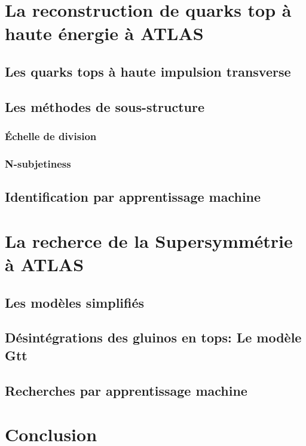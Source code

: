 \documentclass[12pt,canadien]{article}
\begin{document}
\singlespacing{}
\section{La reconstruction de quarks top à haute énergie à ATLAS}
\label{sec:top}
\doublespacing{}

\subsection{Les quarks tops à haute impulsion transverse}
\label{sec:top:boosted}

\subsection{Les méthodes de sous-structure}
\label{sec:top:sous_structure}

\subsubsection{Échelle de division}
\label{sec:top:sous_structure:d_ij}

\subsubsection{N-subjetiness}
\label{sec:top:sous_structure:tau_ij}



\subsection{Identification par apprentissage machine}
\label{sec:top:ml}

\singlespacing{}
\section{La recherce de la Supersymmétrie à ATLAS}
\label{susy_atlas}
\doublespacing{}

\subsection{Les modèles simplifiés}
\label{sec:susy_atlas:modele_simple}

\subsection{Désintégrations des gluinos en tops: Le modèle Gtt}
\label{sec:susy_atlas:gtt}

\subsection{Recherches par apprentissage machine}
\label{sec:susy_atlas:ml}

\section{Conclusion}
\label{sec:conclusion}
\end{document}
